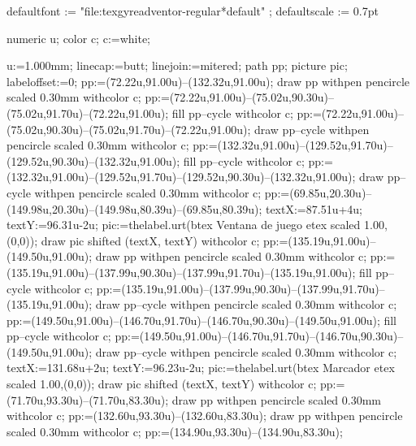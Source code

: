 
\setupwhitespace[medium]
\setuppagenumbering[location=]

\setupbackend[
  format=PDF,
  background=transparent
]

\startTEXpage[offset=0pt]

\startMPinitializations
defaultfont := "file:texgyreadventor-regular*default" ;
defaultscale := 0.7pt
\stopMPinitializations

numeric u;
color c;
c:=white;

u:=1.000mm; linecap:=butt; linejoin:=mitered; path pp; picture pic; labeloffset:=0;
pp:=(72.22u,91.00u)--(132.32u,91.00u);
draw pp withpen pencircle scaled 0.30mm withcolor c;
pp:=(72.22u,91.00u)--(75.02u,90.30u)--(75.02u,91.70u)--(72.22u,91.00u);
fill pp--cycle withcolor c;
pp:=(72.22u,91.00u)--(75.02u,90.30u)--(75.02u,91.70u)--(72.22u,91.00u);
draw pp--cycle withpen pencircle scaled 0.30mm withcolor c;
pp:=(132.32u,91.00u)--(129.52u,91.70u)--(129.52u,90.30u)--(132.32u,91.00u);
fill pp--cycle withcolor c;
pp:=(132.32u,91.00u)--(129.52u,91.70u)--(129.52u,90.30u)--(132.32u,91.00u);
draw pp--cycle withpen pencircle scaled 0.30mm withcolor c;
pp:=(69.85u,20.30u)--(149.98u,20.30u)--(149.98u,80.39u)--(69.85u,80.39u);
textX:=87.51u+4u; textY:=96.31u-2u; pic:=thelabel.urt(btex {Ventana de juego} etex scaled 1.00,(0,0)); draw pic shifted (textX, textY) withcolor c;
pp:=(135.19u,91.00u)--(149.50u,91.00u);
draw pp withpen pencircle scaled 0.30mm withcolor c;
pp:=(135.19u,91.00u)--(137.99u,90.30u)--(137.99u,91.70u)--(135.19u,91.00u);
fill pp--cycle withcolor c;
pp:=(135.19u,91.00u)--(137.99u,90.30u)--(137.99u,91.70u)--(135.19u,91.00u);
draw pp--cycle withpen pencircle scaled 0.30mm withcolor c;
pp:=(149.50u,91.00u)--(146.70u,91.70u)--(146.70u,90.30u)--(149.50u,91.00u);
fill pp--cycle withcolor c;
pp:=(149.50u,91.00u)--(146.70u,91.70u)--(146.70u,90.30u)--(149.50u,91.00u);
draw pp--cycle withpen pencircle scaled 0.30mm withcolor c;
textX:=131.68u+2u; textY:=96.23u-2u; pic:=thelabel.urt(btex {Marcador} etex scaled 1.00,(0,0)); draw pic shifted (textX, textY) withcolor c;
pp:=(71.70u,93.30u)--(71.70u,83.30u);
draw pp withpen pencircle scaled 0.30mm withcolor c;
pp:=(132.60u,93.30u)--(132.60u,83.30u);
draw pp withpen pencircle scaled 0.30mm withcolor c;
pp:=(134.90u,93.30u)--(134.90u,83.30u);
